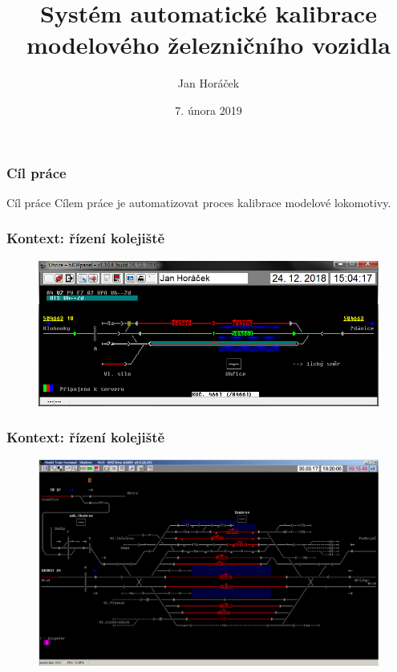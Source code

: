 \documentclass[aspectratio=169]{beamer}
\title[Automatická kalibrace]{Systém automatické kalibrace modelového
železničního vozidla}
\author{Jan Horáček}
\institute[FI MUNI]{
	Fakulta informatiky \\
	Masarykova univerzita \\
	\medskip
	\textit{horacekj@mail.muni.cz}
}
\date{7. února 2019}
\begin{document}

\begin{frame}
\titlepage
\end{frame}


\begin{frame}
\frametitle{Cíl práce}
\begin{block}{Cíl práce}
Cílem práce je automatizovat proces kalibrace modelové lokomotivy.
\end{block}
\end{frame}


\begin{frame}
\frametitle{Kontext: řízení kolejiště}
\begin{figure}
\includegraphics[width=0.7\columnwidth]{data/hJOPpanel-uh.png}
\end{figure}
\end{frame}


\begin{frame}
\frametitle{Kontext: řízení kolejiště}
\begin{figure}
\includegraphics[width=0.75\columnwidth]{data/JOP2-SkLogin.png}
\end{figure}
\end{frame}
\end{document}
